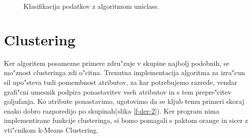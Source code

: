 \documentclass[a4paper]{article}
\begin{document}
	\begin{figure}[H]
	\begin{center}
	\end{center}
	\caption{Klasifikacija podatkov z algoritmom uniclass.}
	\label{f-der-1}
	\end{figure}

\section{Clustering}
	Ker algoritem posamezne primere zdru"zuje v skupine najbolj podobnih, se mo"znost clusteringa zdi o"citna. Trenutna implementacija algoritma za izra"cun sil upo"steva tudi pomembnost atributov, za kar potrebujemo razrede, vendar grafi"cni umesnik podpira ponastavitev vseh atributov in s tem prepre"citev goljufanja. Ko atribute ponastavimo, ugotovimo da se kljub temu primeri skoraj enako dobro razporedijo po skupinah(slika \ref{f-der-2}). Ker program nima implementirane funkcije clusteringa, si bomo pomagali s paktom orange in sicer z vti"cnikom k-Means Clustering.
	
\end{document}
